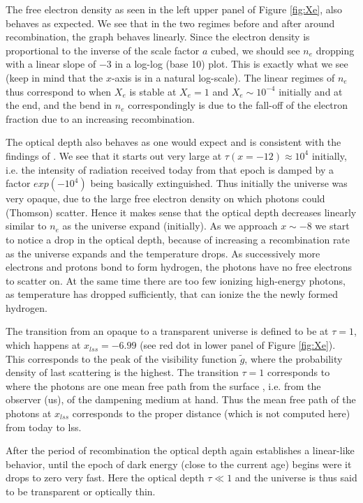 \documentclass[twocolumn]{aastex62}
\begin{document}
The free electron density as seen in the left upper panel of Figure \ref{fig:Xe}, also behaves as expected. We see that in the two regimes before and after around recombination, the graph behaves linearly. Since the electron density is proportional to the inverse of the scale factor $a$ cubed, we should see $n_e$ dropping with a linear slope of $-3$ in a log-log (base 10) plot. This is exactly what we see (keep in mind that the $x$-axis is in a natural log-scale). The linear regimes of $n_e$ thus correspond to when $X_e$ is stable at $X_e = 1$ and $X_e\sim 10^{-4}$ initially and at the end, and the bend in $n_e$ correspondingly is due to the fall-off of the electron fraction due to an increasing recombination. 

The optical depth also behaves as one would expect and is consistent with the findings of \cite{callin:2006}. We see that it starts out very large at $\tau(x = -12) \approx 10^4$ initially, i.e. the intensity of radiation received today from that epoch is damped by a factor $exp(-10^4)$ being basically extinguished. Thus initially the universe was very opaque, due to the large free electron density on which photons could (Thomson) scatter. Hence it makes sense that the optical depth decreases linearly similar to $n_e$ as the universe expand (initially). As we approach $x\sim -8$ we start to notice a drop in the optical depth, because of increasing a recombination rate as the universe expands and the temperature drops. As successively more electrons and protons bond to form hydrogen, the photons have no free electrons to scatter on. At the same time there are too few ionizing high-energy photons, as temperature has dropped sufficiently, that can ionize the the newly formed hydrogen. 

The transition from an opaque to a transparent universe is defined to be at $\tau = 1$, which happens at $x_{lss} = -6.99$ (see red dot in lower panel of Figure \ref{fig:Xe}). This corresponds to the peak of the visibility function $\tilde{g}$, where the probability density of last scattering is the highest. The transition $\tau = 1$ corresponds to where the photons are one mean free path from the surface , i.e. from the observer (us), of the dampening medium at hand. Thus the mean free path of the photons at $x_{lss}$ corresponds to the proper distance (which is not computed here) from today to lss. 

After the period of recombination the optical depth again establishes a linear-like behavior, until the epoch of dark energy (close to the current age) begins were it drops to zero very fast. Here the optical depth $\tau \ll 1$ and the universe is thus said to be transparent or optically thin.
\end{document}
